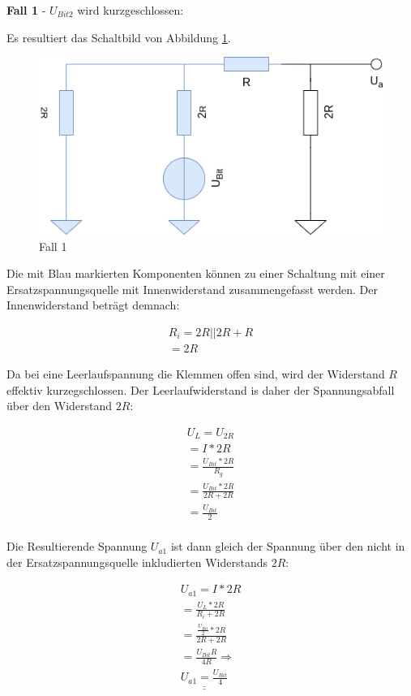 \textbf{Fall 1} - $U_{Bit 2}$ wird kurzgeschlossen:

Es resultiert das Schaltbild von Abbildung \ref{fig:fall-1}.
\begin{figure}[h]
    \centering
    \includegraphics[width=\textwidth]{pictures/a5-1-fall-1.png}
    \caption{Fall 1}
    \label{fig:fall-1}
\end{figure}

\newpage

Die mit Blau markierten Komponenten können  zu einer Schaltung mit einer Ersatzspannungsquelle mit Innenwiderstand zusammengefasst werden.
Der Innenwiderstand beträgt demnach:

\begin{align}
    R_i = 2R || 2R + R \\
    = 2R
\end{align}

Da bei eine Leerlaufspannung die Klemmen offen sind, wird der Widerstand $R$ effektiv kurzegschlossen.
Der Leerlaufwiderstand is daher der Spannungsabfall über den Widerstand $2R$:

\begin{align}
    U_L = U_{2R} \\
    = I * 2R \\
    = \frac{U_{Bit}*2R}{R_g} \\
    = \frac{U_{Bit}*2R}{2R + 2R} \\
    = \frac{U_{Bit}}{2} \\
\end{align}

Die Resultierende Spannung $U_{a1}$ ist dann gleich der Spannung über den nicht in der Ersatzspannungsquelle inkludierten Widerstands $2R$:

\begin{align}
    U_{a1} = I * 2R \\
    = \frac{U_L * 2R}{R_i + 2R} \\
    = \frac{\frac{U_{Bit}}{2} * 2R}{2R + 2R} \\
    = \frac{U_{Bit}R}{4R} \Rightarrow\\
    \underline{\underline{U_{a1} = \frac{U_{Bit}}{4}}}
\end{align}

